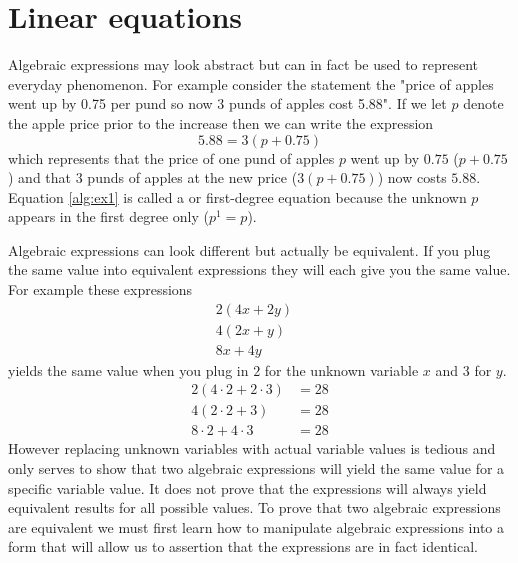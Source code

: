 \section{Linear equations}
Algebraic expressions may look abstract but can in fact be used to represent everyday phenomenon. For example consider the statement the "price of apples went up by 0.75 per pund so now 3 punds of apples cost 5.88". If we let $p$ denote the apple price prior to the increase then we can write the expression
\begin{equation}\label{alg:ex1}
5.88 = 3(p + 0.75)
\end{equation}
which represents that the price of one pund of apples $p$ went up by $0.75$ ($p + 0.75$) and that $3$ punds of apples at the new price ($3(p + 0.75)$) now costs $5.88$. Equation \ref{alg:ex1} is called a  or first-degree equation because the unknown $p$ appears in the first degree only ($p^1 = p$).

Algebraic expressions can look different but actually be equivalent. If
you plug the same value into equivalent expressions they will each give
you the same value. For example these expressions
\begin{align*}
2(4x+2y) &   \\
4(2x+y)  &  \\
8x+4y         &
\end{align*}
yields the same value when you plug in $2$ for the unknown variable $x$
and $3$ for $y$.
\begin{align*}
2(4 \cdot 2 + 2 \cdot 3)  &= 28\\
4(2 \cdot 2 + 3)          &= 28\\
8 \cdot 2 + 4 \cdot 3     &= 28
\end{align*}
However replacing unknown variables with actual variable values is
tedious and only serves to show that two algebraic expressions will yield
the same value for a specific variable value. It does not prove that the
expressions will always yield equivalent results for all possible values.
To prove that two algebraic expressions are equivalent we must first
learn how to manipulate algebraic expressions into a form that will allow
us to assertion that the expressions are in fact identical.


